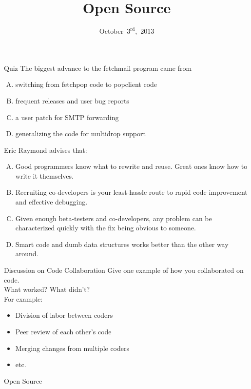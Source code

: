 \documentclass{beamer}
\title{Open Source}
\date{October~$3^{\text{rd}}$,~2013}
\begin{document}
\begin{frame}
\titlepage
\end{frame}

\begin{frame}{Quiz}
The biggest advance to the fetchmail program came from
\begin{enumerate}[(A)]
\item<1> switching from fetchpop code to popclient code
\item<1> frequent releases and user bug reports
\item<1-2> a user patch for SMTP forwarding
\item<1> generalizing the code for multidrop support
\end{enumerate}
\medskip
Eric Raymond advises that:
\begin{enumerate}[(A)]
\item<1> Good programmers know what to rewrite and reuse. Great ones know how to write it themselves.
\item<1> Recruiting co-developers is your least-hassle route to rapid code improvement and effective debugging.
\item<1-2> Given enough beta-testers and co-developers, any problem can be characterized quickly with the fix being obvious to someone.
\item<1>  Smart code and dumb data structures works better than the other way around.
\end{enumerate}
\end{frame}

\begin{frame}{Discussion on Code Collaboration}
Give one example of how you collaborated on code.\\
\bigskip
\bigskip
What worked? What didn't?\\
\bigskip
\bigskip
\pause
For example:
\begin{itemize}
\item Division of labor between coders
\item Peer review of each other's code
\item Merging changes from multiple coders
\item etc.
\end{itemize}
\end{frame}

\begin{frame}{Open Source}
\end{frame}
\end{document}
